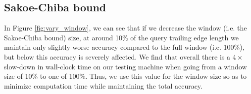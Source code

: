 \subsection{Sakoe-Chiba bound}









In Figure \ref{fig:vary_window}, we can see that if we decrease the window (i.e. the Sakoe-Chiba bound) size, at around 10\% of the query trailing edge length we maintain only slightly worse accuracy compared to the full window (i.e. 100\%), but below this accuracy is severely affected.
We find that overall there is a $4\times$ slow-down in wall-clock time on our testing machine when going from a window size of 10\% to one of 100\%. 
Thus, we use this value for the window size so as to minimize computation time while maintaining the total accuracy.

